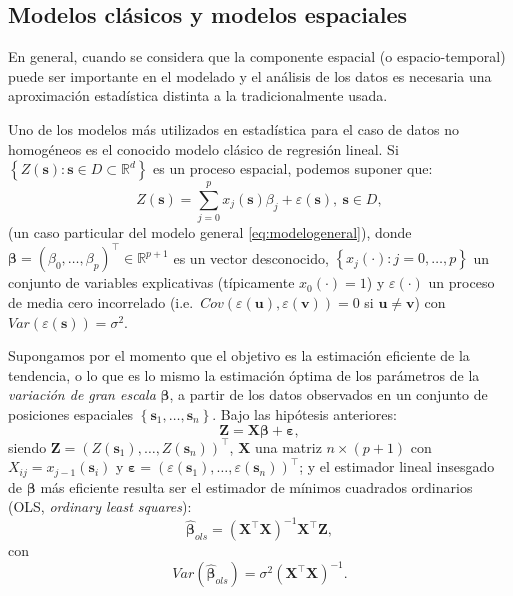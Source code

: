 \documentclass[
  spanish,
]{book}
\theoremstyle{break}
\begin{document}
\hypertarget{modelos-clasicos-espaciales}{%
\subsection{Modelos clásicos y modelos espaciales}\label{modelos-clasicos-espaciales}}

En general, cuando se considera que la componente espacial (o espacio-temporal) puede ser importante en el modelado y el análisis de los datos es necesaria una aproximación estadística distinta a la tradicionalmente usada.

Uno de los modelos más utilizados en estadística para el caso de datos no homogéneos es el conocido modelo clásico de regresión lineal.
Si \(\left\{ Z(\mathbf{s}):\mathbf{s}\in D\subset \mathbb{R}^{d} \right\}\) es un proceso espacial, podemos suponer que:
\[Z(\mathbf{s})=\sum\limits_{j=0}^{p}x_{j}(\mathbf{s})\beta_{j} +\varepsilon(\mathbf{s}),\ \mathbf{s}\in D,\]
(un caso particular del modelo general \eqref{eq:modelogeneral}), donde \(\boldsymbol{\beta }=(\beta_{0}, \ldots,\beta_{p})^{\top}\in \mathbb{R}^{p+1}\) es un vector desconocido, \(\left\{ x_{j} (\cdot):j=0, \ldots,p\right\}\) un conjunto de variables explicativas (típicamente \(x_0(\cdot)=1\)) y \(\varepsilon(\cdot)\) un proceso de media cero incorrelado (i.e.~\(Cov(\varepsilon (\mathbf{u}),\varepsilon (\mathbf{v}))=0\) si \(\mathbf{u}\neq \mathbf{v}\)) con \(Var(\varepsilon (\mathbf{s}))=\sigma^{2}\).

Supongamos por el momento que el objetivo es la estimación eficiente de la tendencia, o lo que es lo mismo la estimación óptima de los parámetros de la \emph{variación de gran escala} \(\boldsymbol{\beta}\), a partir de los datos observados en un conjunto de posiciones espaciales \(\left\{ \mathbf{s}_{1}, \ldots,\mathbf{s}_{n} \right\}\).
Bajo las hipótesis anteriores:
\[\mathbf{Z} = \mathbf{X}\boldsymbol{\beta} + \boldsymbol{\varepsilon},\]
siendo \(\mathbf{Z}=\left( Z(\mathbf{s}_{1}), \ldots,Z(\mathbf{s}_{n}) \right)^{\top}\), \(\mathbf{X}\) una matriz \(n\times (p+1)\) con \(X_{ij}=x_{j-1}(\mathbf{s}_{i})\) y \(\boldsymbol{\varepsilon} = \left( \varepsilon (\mathbf{s}_{1}), \ldots,\varepsilon (\mathbf{s}_{n})\right)^{\top}\); y el estimador lineal insesgado de \(\boldsymbol{\beta}\) más eficiente resulta ser el estimador de mínimos cuadrados ordinarios (OLS, \emph{ordinary least squares}):
\begin{equation} 
  \hat{\boldsymbol{\beta}}_{ols}=(\mathbf{X}^{\top}\mathbf{X})^{-1}\mathbf{X}^{\top}\mathbf{Z},
  \label{eq:beta-ols}
\end{equation}
con \[Var(\hat{\boldsymbol{\beta}}_{ols})=\sigma^{2}(\mathbf{X}^{\top}\mathbf{X})^{-1}.\]
\end{document}
